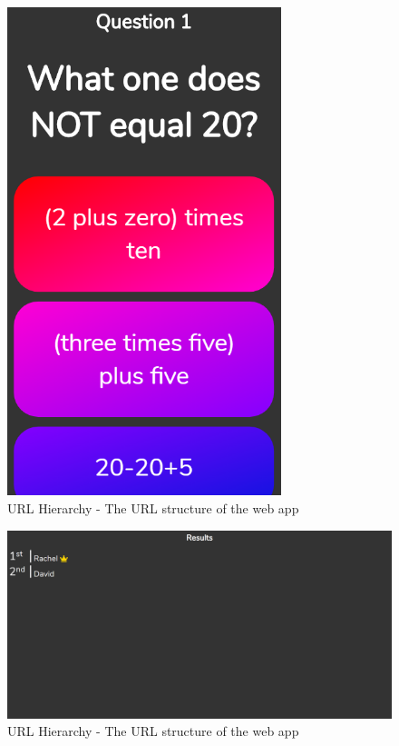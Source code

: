 \documentclass[10pt, a4paper]{article}
\begin{document}
\begin{figure}
\includegraphics[width=8cm]{quizScreenM.PNG}
\caption[width=10cm]{URL Hierarchy - The URL structure of the web app} \label{quizScreenM}
\end{figure}

\begin{figure}
\includegraphics[width=\textwidth]{resultsScreen.PNG}
\caption[width=\textwidth]{URL Hierarchy - The URL structure of the web app} \label{resultsScreen}
\end{figure}
\end{document}
